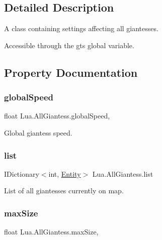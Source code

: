 \subsection{Detailed Description}
A class containing settings affecting all giantesses. 

Accessible through the {\ttfamily gts} global variable. 

\subsection{Property Documentation}
\mbox{\label{class_lua_1_1_all_giantess_a76e7e6cca768273ffd53a6b8a3127ffe}} 
\subsubsection{\texorpdfstring{globalSpeed}{globalSpeed}}
{\footnotesize\ttfamily float Lua.\+All\+Giantess.\+global\+Speed\hspace{0.3cm}{\ttfamily [get]}, {\ttfamily [set]}}



Global giantess speed. 

\mbox{\label{class_lua_1_1_all_giantess_adc5824c47c4090e1d8769ddde5c9da6a}} 
\subsubsection{\texorpdfstring{list}{list}}
{\footnotesize\ttfamily I\+Dictionary$<$int, \mbox{\hyperlink{class_lua_1_1_entity}{Entity}}$>$ Lua.\+All\+Giantess.\+list\hspace{0.3cm}{\ttfamily [get]}}



List of all giantesses currently on map. 

\mbox{\label{class_lua_1_1_all_giantess_af82af573b560f17c3b0cd575bd61ed00}} 
\subsubsection{\texorpdfstring{maxSize}{maxSize}}
{\footnotesize\ttfamily float Lua.\+All\+Giantess.\+max\+Size\hspace{0.3cm}{\ttfamily [get]}, {\ttfamily [set]}}



